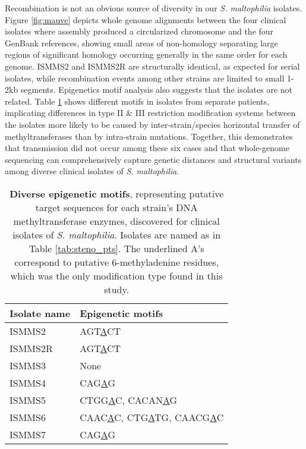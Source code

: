 Recombination is not an obvious source of diversity in our \emph{S. maltophilia} isolates. Figure \ref{fig:mauve} depicts whole genome alignments between the four clinical isolates where assembly produced a circularized chromosome and the four GenBank references, showing small areas of non-homology separating large regions of significant homology occurring generally in the same order for each genome. ISMMS2 and ISMMS2R are structurally identical, as expected for serial isolates, while recombination events among other strains are limited to small 1-2kb segments. Epigenetics motif analysis also suggests that the isolates are not related. Table \ref{tab:steno_epimotifs} shows different motifs in isolates from separate patients, implicating differences in type II \& III restriction modification systems between the isolates more likely to be caused by inter-strain/species horizontal transfer of methyltransferases than by intra-strain mutations.\autocite{Srikhanta2010} Together, this demonstrates that transmission did not occur among these six cases and that whole-genome sequencing can comprehensively capture genetic distances and structural variants among diverse clinical isolates of \emph{S. maltophilia}.

\begin{table}[ht]
  \centering
  \begin{tabular}{l l}
    \toprule
    Isolate name & Epigenetic motifs \\
    \midrule
    ISMMS2   & AGT\underline{A}CT \\
    ISMMS2R  & AGT\underline{A}CT \\
    ISMMS3   & None \\
    ISMMS4   & CAG\underline{A}G \\
    ISMMS5   & CTGG\underline{A}C, CACAN\underline{A}G \\
    ISMMS6   & CAAC\underline{A}C, CTG\underline{A}TG, CAACG\underline{A}C \\
    ISMMS7   & CAG\underline{A}G \\
    \bottomrule
  \end{tabular}
  \caption[Epigenetic motifs for clinical isolates of \emph{S. maltophilia}]{\textbf{Diverse epigenetic motifs}, representing putative target sequences for each strain’s DNA methyltransferase enzymes, discovered for clinical isolates of \emph{S. maltophilia}.  Isolates are named as in Table \ref{tab:steno_pts}. The underlined A’s correspond to putative 6-methyladenine residues, which was the only modification type found in this study.}
  \label{tab:steno_epimotifs}
\end{table}

